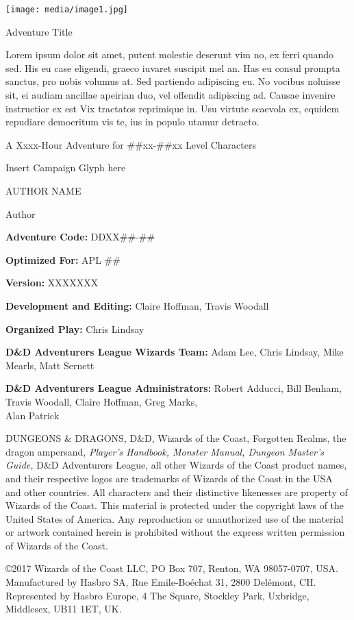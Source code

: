 \texttt{[image: media/image1.jpg]}

Adventure Title

Lorem ipsum dolor sit amet, putent molestie deserunt vim no, ex ferri
quando sed. His eu case eligendi, graeco iuvaret suscipit mel an. Has eu
consul prompta sanctus, pro nobis volumus at. Sed partiendo adipiscing
eu. No vocibus noluisse sit, ei audiam ancillae apeirian duo, vel
offendit adipiscing ad. Causae invenire instructior ex est Vix tractatos
reprimique in. Usu virtute scaevola ex, equidem repudiare democritum vis
te, ius in populo utamur detracto.

A Xxxx-Hour Adventure for \#\#xx-\#\#xx Level Characters

Insert Campaign Glyph here

AUTHOR NAME

Author

\textbf{Adventure Code:} DDXX\#\#-\#\#

\textbf{Optimized For:} APL \#\#

\textbf{Version:} XXXXXXX

\textbf{Development and Editing:} Claire Hoffman, Travis Woodall

\textbf{Organized Play:} Chris Lindsay

\textbf{D\&D Adventurers League Wizards Team:} Adam Lee, Chris Lindsay,
Mike Mearls, Matt Sernett

\textbf{D\&D Adventurers League Administrators:} Robert Adducci, Bill
Benham, Travis Woodall, Claire Hoffman, Greg Marks,\\
Alan Patrick

DUNGEONS \& DRAGONS, D\&D, Wizards of the Coast, Forgotten Realms, the
dragon ampersand, \emph{Player's Handbook, Monster Manual, Dungeon
Master's Guide,} D\&D Adventurers League, all other Wizards of the Coast
product names, and their respective logos are trademarks of Wizards of
the Coast in the USA and other countries. All characters and their
distinctive likenesses are property of Wizards of the Coast. This
material is protected under the copyright laws of the United States of
America. Any reproduction or unauthorized use of the material or artwork
contained herein is prohibited without the express written permission of
Wizards of the Coast.

©2017 Wizards of the Coast LLC, PO Box 707, Renton, WA 98057-0707, USA.
Manufactured by Hasbro SA, Rue Emile-Boéchat 31, 2800 Delémont, CH.
Represented by Hasbro Europe, 4 The Square, Stockley Park, Uxbridge,
Middlesex, UB11 1ET, UK.

